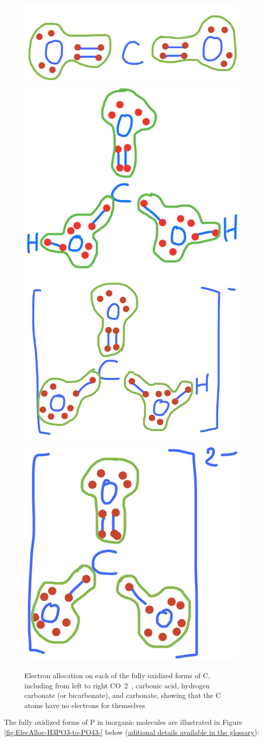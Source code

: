 \documentclass[]{book}
\theoremstyle{definition}
\theoremstyle{definition}
\theoremstyle{definition}
\theoremstyle{remark}
\begin{document}
\begin{figure}

{\centering \includegraphics[width=0.22\linewidth]{pictures/ElecAlloc_CO2} \includegraphics[width=0.22\linewidth]{pictures/ElecAlloc_H2CO3} \includegraphics[width=0.22\linewidth]{pictures/ElecAlloc_HCO3-} \includegraphics[width=0.22\linewidth]{pictures/ElecAlloc_CO32-} 

}

\caption{Electron allocation on each of the fully oxidized forms of C, including from left to right CO~2~, carbonic acid, hydrogen carbonate (or bicarbonate), and carbonate, showing that the C atoms have no electrons for themselves}\label{fig:ElecAlloc-CO2-to-CO32-}
\end{figure}

The fully oxidized forms of P in inorganic molecules are illustrated in
Figure \ref{fig:ElecAlloc-H3PO3-to-PO43-} below
(\protect\hyperlink{phosphate}{aditional details available in the
glossary}):
\end{document}
